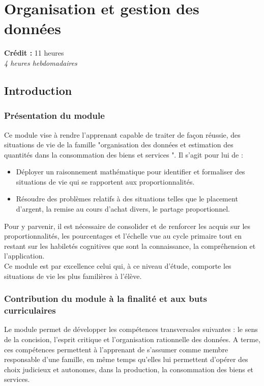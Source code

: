 \chapter{Organisation et gestion des données}

{\AlegreyaSansLight \large
\begin{center}
\textbf{Crédit :} 11 heures\\
\textit{4 heures hebdomadaires}
\end{center}
}

\minitoc

\section{Introduction}

\subsection{Présentation du module}
Ce module vise à rendre l'apprenant capable de traiter de façon réussie, des situations de vie de la famille  "organisation des données et estimation des quantités dans la consommation des biens et services ". Il s'agit pour lui de :
\begin{itemize}
\item Déployer un raisonnement mathématique pour identifier et formaliser des situations de vie qui se rapportent aux proportionnalités.
\item Résoudre des problèmes relatifs à des situations telles que le placement d'argent, la remise au cours d'achat divers, le partage proportionnel.
\end{itemize}
Pour y parvenir, il est nécessaire de consolider et de renforcer les acquis sur les proportionnalités, les pourcentages et l'échelle vue au cycle primaire tout en restant sur les habiletés cognitives que sont la connaissance, la compréhension et l'application.\\
Ce module est par excellence celui qui, à ce niveau d'étude, comporte les situations de vie les plus familières à l'élève.

\subsection{Contribution du module à la finalité et aux buts curriculaires}
Le module permet de développer les compétences transversales suivantes : le sens de la concision, l'esprit critique et l'organisation rationnelle des données. A terme, ces compétences permettent à l'apprenant de s'assumer comme membre responsable d'une famille, en même temps qu'elles lui permettent d'opérer des choix
judicieux et autonomes, dans la production, la consommation des biens et services.

